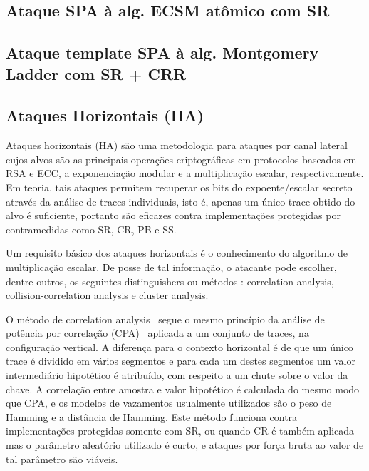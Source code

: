 \subsection{Ataque SPA à alg. ECSM atômico com SR}

\subsection{Ataque template SPA à alg. Montgomery Ladder com SR + CRR}


\subsection{Ataques Horizontais (HA)}

Ataques horizontais (HA) são uma metodologia para ataques por canal lateral cujos alvos são as principais operações criptográficas em protocolos baseados em RSA e ECC, a exponenciação modular e a multiplicação escalar, respectivamente. Em teoria, tais ataques permitem recuperar os bits do expoente/escalar secreto através da análise de traces individuais, isto é, apenas um único trace obtido do alvo é suficiente, portanto são eficazes contra implementações protegidas por contramedidas como SR, CR, PB e SS.

Um requisito básico dos ataques horizontais é o conhecimento do algoritmo de multiplicação escalar. De posse de tal informação, o atacante pode escolher, dentre outros, os seguintes distinguishers ou métodos : correlation analysis, collision-correlation analysis e cluster analysis.     %

O método de correlation analysis~\cite{Clavier2010} segue o mesmo princípio da análise de potência por correlação (CPA)~ aplicada a um conjunto de traces, na configuração vertical. A diferença para o contexto horizontal é de que um único trace é dividido em vários segmentos e para cada um destes segmentos um valor intermediário hipotético é atribuído, com respeito a um chute sobre o valor da chave. A correlação entre amostra e valor hipotético é calculada do mesmo modo que CPA, e os modelos de vazamentos usualmente utilizados são o peso de Hamming e a distância de Hamming. Este método funciona contra implementações protegidas somente com SR, ou quando CR é também aplicada mas o parâmetro aleatório utilizado é curto, e ataques por força bruta ao valor de tal parâmetro são viáveis.

